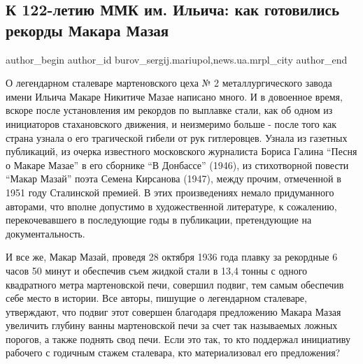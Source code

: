  
 
 
 
 
 
\subsection{К 122-летию ММК им. Ильича: как готовились рекорды Макара Мазая}
\label{sec:16_02_2019.stz.news.ua.mrpl_city.1.k_122_letiu_mmk_im_iljicha_rekordy_makara_mazaja}
 
\ifcmt
 author_begin
   author_id burov_sergij.mariupol,news.ua.mrpl_city
 author_end
\fi


О легендарном сталеваре мартеновского цеха № 2 металлургического завода имени
Ильича Макаре Никитиче Мазае написано много. И в довоенное время, вскоре после
установления им рекордов по выплавке стали, как об одном из инициаторов
стахановского движения, и неизмеримо больше - после того как страна узнала о
его трагической гибели от рук гитлеровцев. Узнала из газетных публикаций, из
очерка известного московского журналиста Бориса Галина \enquote{Песня о Макаре Мазае} в
его сборнике \enquote{В Донбассе} (1946), из стихотворной повести \enquote{Макар Мазай} поэта
Семена Кирсанова (1947), между прочим, отмеченной в 1951 году Сталинской
премией. В этих произведениях немало придуманного авторами, что вполне
допустимо в художественной литературе, к сожалению, перекочевавшего в
последующие годы в публикации, претендующие на документальность.

И все же, Макар Мазай, проведя 28 октября 1936 года плавку за рекордные 6 часов
50 минут и обеспечив съем жидкой стали в 13,4 тонны с одного квадратного метра
мартеновской печи, совершил подвиг, тем самым обеспечив себе место в истории.
Все авторы, пишущие о легендарном сталеваре, утверждают, что подвиг этот
совершен благодаря предложению Макара Мазая увеличить глубину ванны
мартеновской печи за счет так называемых ложных порогов, а также поднять свод
печи. Если это так, то кто поддержал инициативу рабочего с годичным стажем
сталевара, кто материализовал его предложения?

